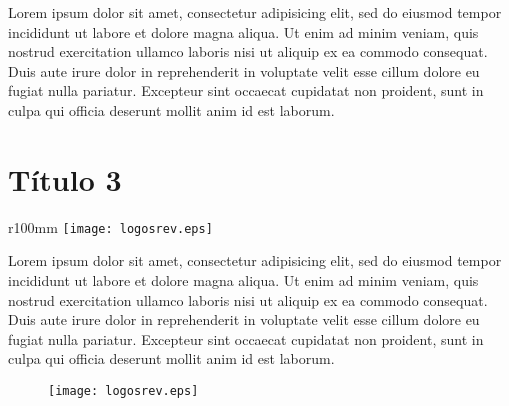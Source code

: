 \documentclass[a4paper,10pt,twoside]{article}
\begin{document}
\def\svgwidth{15.05cm}
\vspace*{-4mm}\hspace*{-7mm}

Lorem ipsum dolor sit amet, consectetur adipisicing elit, sed do eiusmod tempor incididunt ut labore 
et dolore magna aliqua. Ut enim ad minim veniam, quis nostrud exercitation ullamco laboris nisi ut 
aliquip ex ea commodo consequat. Duis aute irure dolor in reprehenderit in voluptate velit esse cillum 
dolore eu fugiat nulla pariatur. Excepteur sint occaecat cupidatat non proident, sunt in culpa qui 
officia deserunt mollit anim id est laborum.

\section{Título 3}
\begin{wrapfigure}{r}{100mm}
\vspace{-4mm}%
    \texttt{[image: logosrev.eps]}
\vspace*{-6mm}\label{figura1}
\vspace*{-3mm}
\end{wrapfigure}
Lorem ipsum dolor sit amet, consectetur adipisicing elit, sed do eiusmod tempor incididunt ut labore 
et dolore magna aliqua. Ut enim ad minim veniam, quis nostrud exercitation ullamco laboris nisi ut 
aliquip ex ea commodo consequat. Duis aute irure dolor in reprehenderit in voluptate velit esse cillum 
dolore eu fugiat nulla pariatur. Excepteur sint occaecat cupidatat non proident, sunt in culpa qui 
officia deserunt mollit anim id est laborum.

\begin{figure}[htbp!]
 \texttt{[image: logosrev.eps]}
\end{figure}
\end{document}
